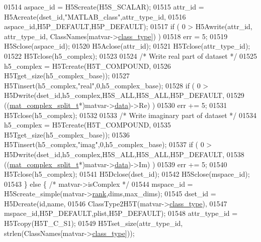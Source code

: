 \begin{DoxyCode}
{{01514         aspace\_id = H5Screate(H5S\_SCALAR);
01515         attr\_id = H5Acreate(dset\_id,\textcolor{stringliteral}{"MATLAB\_class"},attr\_type\_id,
01516                             aspace\_id,H5P\_DEFAULT,H5P\_DEFAULT);
01517         \textcolor{keywordflow}{if} ( 0 > H5Awrite(attr\_id, attr\_type\_id, ClassNames[matvar->\hyperlink{group___m_a_t_aff13035bf3265dd7d9425e5d40c839d4}{class\_type}]) )
01518             err = 5;
01519         H5Sclose(aspace\_id);
01520         H5Aclose(attr\_id);
01521         H5Tclose(attr\_type\_id);
01522         H5Tclose(h5\_complex);
01523 
01524         \textcolor{comment}{/* Write real part of dataset */}
01525         h5\_complex = H5Tcreate(H5T\_COMPOUND,
01526                                H5Tget\_size(h5\_complex\_base));
01527         H5Tinsert(h5\_complex,\textcolor{stringliteral}{"real"},0,h5\_complex\_base);
01528         \textcolor{keywordflow}{if} ( 0 > H5Dwrite(dset\_id,h5\_complex,H5S\_ALL,H5S\_ALL,H5P\_DEFAULT,
01529                           ((\hyperlink{group___m_a_t_structmat__complex__split__t}{mat\_complex\_split\_t}*)matvar->\hyperlink{group___m_a_t_a5672978efa230bbdecdf38ede781f7fa}{data})->Re) )
01530             err += 5;
01531         H5Tclose(h5\_complex);
01532 
01533         \textcolor{comment}{/* Write imaginary part of dataset */}
01534         h5\_complex = H5Tcreate(H5T\_COMPOUND,
01535                                H5Tget\_size(h5\_complex\_base));
01536         H5Tinsert(h5\_complex,\textcolor{stringliteral}{"imag"},0,h5\_complex\_base);
01537         \textcolor{keywordflow}{if} ( 0 > H5Dwrite(dset\_id,h5\_complex,H5S\_ALL,H5S\_ALL,H5P\_DEFAULT,
01538                           ((\hyperlink{group___m_a_t_structmat__complex__split__t}{mat\_complex\_split\_t}*)matvar->\hyperlink{group___m_a_t_a5672978efa230bbdecdf38ede781f7fa}{data})->Im) )
01539             err += 5;
01540         H5Tclose(h5\_complex);
01541         H5Dclose(dset\_id);
01542         H5Sclose(mspace\_id);
01543     \} \textcolor{keywordflow}{else} \{ \textcolor{comment}{/* matvar->isComplex */}
01544         mspace\_id = H5Screate\_simple(matvar->\hyperlink{group___m_a_t_a84ba70c96ded13cc555fa75b768d9921}{rank},dims,max\_dims);
01545         dset\_id = H5Dcreate(\textcolor{keywordtype}{id},name,
01546                             ClassType2H5T(matvar->\hyperlink{group___m_a_t_aff13035bf3265dd7d9425e5d40c839d4}{class\_type}),
01547                             mspace\_id,H5P\_DEFAULT,plist,H5P\_DEFAULT);
01548         attr\_type\_id = H5Tcopy(H5T\_C\_S1);
01549         H5Tset\_size(attr\_type\_id, strlen(ClassNames[matvar->\hyperlink{group___m_a_t_aff13035bf3265dd7d9425e5d40c839d4}{class\_type}]));
}}
\end{DoxyCode}
